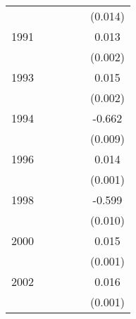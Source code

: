 {\begin{tabular}{l*{5}{c}}
                    &                     &                     &                     &                     &     (0.014)         \\
[1em]
1991                &                     &                     &                     &                     &       0.013\sym{***}\\
                    &                     &                     &                     &                     &     (0.002)         \\
[1em]
1993                &                     &                     &                     &                     &       0.015\sym{***}\\
                    &                     &                     &                     &                     &     (0.002)         \\
[1em]
1994                &                     &                     &                     &                     &      -0.662\sym{***}\\
                    &                     &                     &                     &                     &     (0.009)         \\
[1em]
1996                &                     &                     &                     &                     &       0.014\sym{***}\\
                    &                     &                     &                     &                     &     (0.001)         \\
[1em]
1998                &                     &                     &                     &                     &      -0.599\sym{***}\\
                    &                     &                     &                     &                     &     (0.010)         \\
[1em]
2000                &                     &                     &                     &                     &       0.015\sym{***}\\
                    &                     &                     &                     &                     &     (0.001)         \\
[1em]
2002                &                     &                     &                     &                     &       0.016\sym{***}\\
                    &                     &                     &                     &                     &     (0.001)         \\

\end{tabular}}
